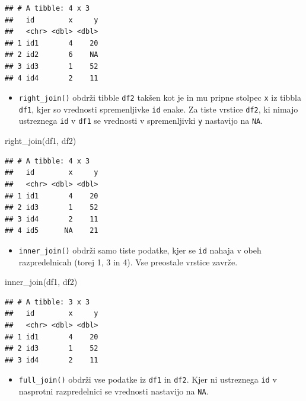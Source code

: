 \documentclass[
]{book}
\newenvironment{Shaded}{\begin{snugshade}}{\end{snugshade}}
\newcommand{\FunctionTok}[1]{\textcolor[rgb]{0.00,0.00,0.00}{#1}}
\newcommand{\NormalTok}[1]{#1}
\providecommand{\tightlist}{%
  \setlength{\itemsep}{0pt}\setlength{\parskip}{0pt}}
\begin{document}
\begin{verbatim}
## # A tibble: 4 x 3
##   id        x     y
##   <chr> <dbl> <dbl>
## 1 id1       4    20
## 2 id2       6    NA
## 3 id3       1    52
## 4 id4       2    11
\end{verbatim}

\begin{itemize}
\tightlist
\item
  \texttt{right\_join()} obdrži tibble \texttt{df2} takšen kot je in mu pripne stolpec \texttt{x} iz tibbla \texttt{df1}, kjer so vrednosti spremenljivke \texttt{id} enake. Za tiste vrstice \texttt{df2}, ki nimajo ustreznega \texttt{id} v \texttt{df1} se vrednosti v spremenljivki \texttt{y} nastavijo na \texttt{NA}.
\end{itemize}

\begin{Shaded}
\begin{Highlighting}[]
\FunctionTok{right\_join}\NormalTok{(df1, df2)}
\end{Highlighting}
\end{Shaded}

\begin{verbatim}
## # A tibble: 4 x 3
##   id        x     y
##   <chr> <dbl> <dbl>
## 1 id1       4    20
## 2 id3       1    52
## 3 id4       2    11
## 4 id5      NA    21
\end{verbatim}

\begin{itemize}
\tightlist
\item
  \texttt{inner\_join()} obdrži samo tiste podatke, kjer se \texttt{id} nahaja v obeh razpredelnicah (torej 1, 3 in 4). Vse preostale vrstice zavrže.
\end{itemize}

\begin{Shaded}
\begin{Highlighting}[]
\FunctionTok{inner\_join}\NormalTok{(df1, df2)}
\end{Highlighting}
\end{Shaded}

\begin{verbatim}
## # A tibble: 3 x 3
##   id        x     y
##   <chr> <dbl> <dbl>
## 1 id1       4    20
## 2 id3       1    52
## 3 id4       2    11
\end{verbatim}

\begin{itemize}
\tightlist
\item
  \texttt{full\_join()} obdrži vse podatke iz \texttt{df1} in \texttt{df2}. Kjer ni ustreznega \texttt{id} v nasprotni razpredelnici se vrednosti nastavijo na \texttt{NA}.
\end{itemize}
\end{document}
